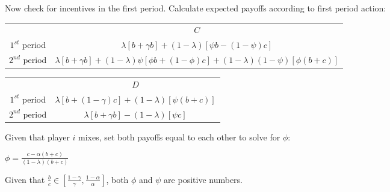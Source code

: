 \documentclass[12pt]{article}
\begin{document}
Now check for incentives in the first period. Calculate expected payoffs according to first period action:
\begin{center}
\begin{tabular}{cc}
 & $C$  \\
\cline{1-2}
\small{$1^{st}$ period} & $\lambda[b+\gamma b]+(1-\lambda)[\psi b-(1-\psi)c]$  \\
\small{$2^{nd}$ period} & $\lambda[b+\gamma b]+(1-\lambda)\psi[\phi b+(1-\phi)c]+(1-\lambda)(1-\psi)[\phi(b+c)]$ \\
\end{tabular}
\end{center}

\begin{center}
\begin{tabular}{cc}
 & $D$  \\
\cline{1-2}
\small{$1^{st}$ period} & $\lambda[b+(1-\gamma)c]+(1-\lambda)[\psi(b+c)]$ \\
\small{$2^{nd}$ period} & $\lambda[b+\gamma b] -(1-\lambda)[\psi c]$ \\
\end{tabular}
\end{center}

Given that player $i$ mixes, set both payoffs equal to each other to solve for $\phi$:
\begin{center}
$\displaystyle{\phi = \frac{c-\alpha(b+c)}{(1-\lambda)(b+c)}}$
\end{center}

Given that  $\frac{b}{c} \in [\frac{1-\gamma}{\gamma},\frac{1-\alpha}{\alpha}]$, both $\phi$ and $\psi$ are positive numbers.
\end{document}
